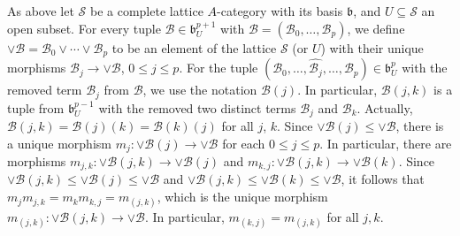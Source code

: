 \documentclass[12pt]{amsart}%
\theoremstyle{plain}
\numberwithin{equation}{section}
\numberwithin{equation}{section}
\numberwithin{theorem}{section}
\numberwithin{lemma}{section}
\numberwithin{remark}{section}
\numberwithin{example}{section}
\numberwithin{proposition}{section}
\numberwithin{definition}{section}
\numberwithin{corollary}{section}
\begin{document}
As above let $\mathcal{S}$ be a complete lattice $A$-category with its basis
$\mathfrak{b}$, and $U\subseteq\mathcal{S}$ an open subset. For every tuple
$\mathcal{B}\in\mathfrak{b}_{U}^{p+1}$ with $\mathcal{B}=\left(
\mathcal{B}_{0},\ldots,\mathcal{B}_{p}\right)  $, we define $\vee
\mathcal{B}=\mathcal{B}_{0}\vee\cdots\vee\mathcal{B}_{p}$ to be an element of
the lattice $\mathcal{S}$ (or $U$) with their unique morphisms $\mathcal{B}%
_{j}\rightarrow\vee\mathcal{B}$, $0\leq j\leq p$. For the tuple $\left(
\mathcal{B}_{0},\ldots,\widehat{\mathcal{B}_{j}},\ldots,\mathcal{B}%
_{p}\right)  \in\mathfrak{b}_{U}^{p}$ with the removed term $\mathcal{B}_{j}$
from $\mathcal{B}$, we use the notation $\mathcal{B}\left(  j\right)  $. In
particular, $\mathcal{B}\left(  j,k\right)  $ is a tuple from $\mathfrak{b}%
_{U}^{p-1}$ with the removed two distinct terms $\mathcal{B}_{j}$ and
$\mathcal{B}_{k}$. Actually, $\mathcal{B}\left(  j,k\right)  =\mathcal{B}%
\left(  j\right)  \left(  k\right)  =\mathcal{B}\left(  k\right)  \left(
j\right)  $ for all $j$, $k$. Since $\vee\mathcal{B}\left(  j\right)  \leq
\vee\mathcal{B}$, there is a unique morphism $m_{j}:\vee\mathcal{B}\left(
j\right)  \rightarrow\vee\mathcal{B}$ for each $0\leq j\leq p$. In particular,
there are morphisms $m_{j,k}:\vee\mathcal{B}\left(  j,k\right)  \rightarrow
\vee\mathcal{B}\left(  j\right)  $ and $m_{k,j}:\vee\mathcal{B}\left(
j,k\right)  \rightarrow\vee\mathcal{B}\left(  k\right)  $. Since
$\vee\mathcal{B}\left(  j,k\right)  \leq\vee\mathcal{B}\left(  j\right)
\leq\vee\mathcal{B}$ and $\vee\mathcal{B}\left(  j,k\right)  \leq
\vee\mathcal{B}\left(  k\right)  \leq\vee\mathcal{B}$, it follows that
$m_{j}m_{j,k}=m_{k}m_{k,j}=m_{\left(  j,k\right)  }$, which is the unique
morphism $m_{\left(  j,k\right)  }:\vee\mathcal{B}\left(  j,k\right)
\rightarrow\vee\mathcal{B}$. In particular, $m_{\left(  k,j\right)
}=m_{\left(  j,k\right)  }$ for all $j,k$.
\end{document}
